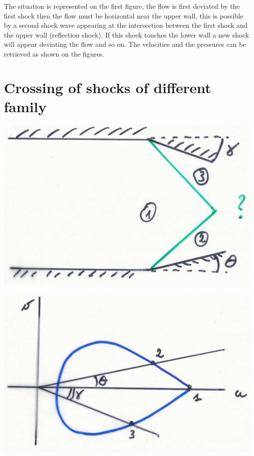 \begin{center}
\begin{minipage}{0.25\textwidth}
\end{minipage}
\end{center}

The situation is represented on the first figure, the flow is first deviated by the first shock then the flow must be horizontal near the upper wall, this is possible by a second shock wave appearing at the intersection between the first shock and the upper wall (reflection shock). If this shock touches the lower wall a new shock will appear deviating the flow and so on. The velocities and the pressures can be retrieved as shown on the figures. 

\section{Crossing of shocks of different family}
\begin{center}
\begin{minipage}{0.4\textwidth}
\includegraphics[scale=0.3]{ch9/8}
\end{minipage}
\begin{minipage}{0.35\textwidth}
\includegraphics[scale=0.25]{ch9/9}
\end{minipage}
\end{center}

